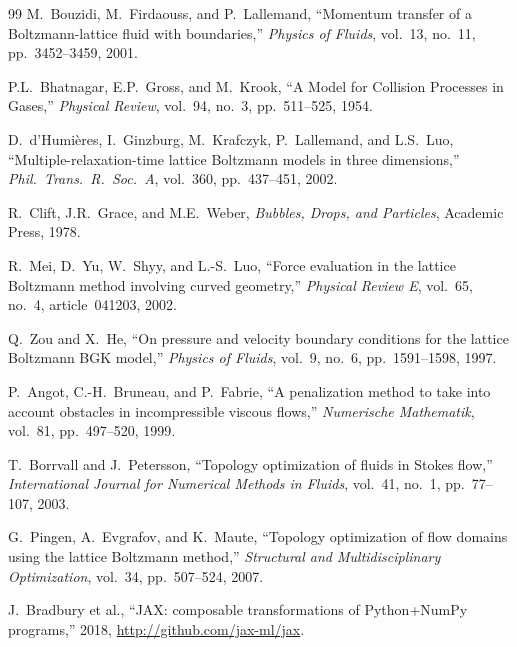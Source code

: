 \documentclass[10pt,twocolumn]{article}
\begin{document}
\begin{thebibliography}{99}
M.~Bouzidi, M.~Firdaouss, and P.~Lallemand,
``Momentum transfer of a Boltzmann-lattice fluid with boundaries,''
\emph{Physics of Fluids}, vol.~13, no.~11, pp.~3452--3459, 2001.

P.L.~Bhatnagar, E.P.~Gross, and M.~Krook,
``A Model for Collision Processes in Gases,''
\emph{Physical Review}, vol.~94, no.~3, pp.~511--525, 1954.

D.~d'Humi\`eres, I.~Ginzburg, M.~Krafczyk, P.~Lallemand, and
L.S.~Luo,
``Multiple-relaxation-time lattice Boltzmann models in three
dimensions,''
\emph{Phil.\ Trans.\ R.\ Soc.\ A}, vol.~360, pp.~437--451, 2002.

R.~Clift, J.R.~Grace, and M.E.~Weber,
\emph{Bubbles, Drops, and Particles}, Academic Press, 1978.

R.~Mei, D.~Yu, W.~Shyy, and L.-S.~Luo,
``Force evaluation in the lattice Boltzmann method involving curved
geometry,''
\emph{Physical Review E}, vol.~65, no.~4, article~041203, 2002.

Q.~Zou and X.~He,
``On pressure and velocity boundary conditions for the lattice
Boltzmann BGK model,''
\emph{Physics of Fluids}, vol.~9, no.~6, pp.~1591--1598, 1997.

P.~Angot, C.-H.~Bruneau, and P.~Fabrie,
``A penalization method to take into account obstacles in
incompressible viscous flows,''
\emph{Numerische Mathematik}, vol.~81, pp.~497--520, 1999.

T.~Borrvall and J.~Petersson,
``Topology optimization of fluids in Stokes flow,''
\emph{International Journal for Numerical Methods in Fluids},
vol.~41, no.~1, pp.~77--107, 2003.

G.~Pingen, A.~Evgrafov, and K.~Maute,
``Topology optimization of flow domains using the lattice Boltzmann
method,''
\emph{Structural and Multidisciplinary Optimization}, vol.~34,
pp.~507--524, 2007.

J.~Bradbury et al.,
``JAX: composable transformations of Python+NumPy programs,''
2018, \url{http://github.com/jax-ml/jax}.

\end{thebibliography}
\end{document}
